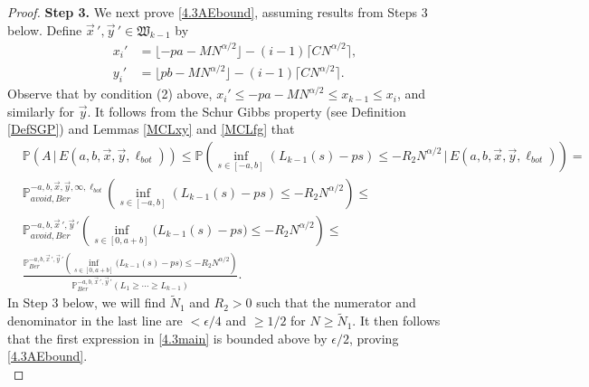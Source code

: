 \begin{proof}
		\noindent\textbf{Step 3.} We next prove \eqref{4.3AEbound}, assuming results from Steps 3 below. Define $\vec{x}\,',\vec{y}\,' \in \mathfrak{W}_{k-1}$ by
		\begin{align*}
		x_i' &= \lfloor - pa - MN^{\alpha/2}\rfloor - (i-1)\lceil CN^{\alpha/2}\rceil,\\
		y_i' &= \lfloor pb - MN^{\alpha/2}\rfloor - (i-1)\lceil CN^{\alpha/2}\rceil.
		\end{align*}  
		Observe that by condition (2) above, $x_i'\leq -pa - MN^{\alpha/2} \leq x_{k-1} \leq x_i$, and similarly for $\vec{y}$. It follows from the Schur Gibbs property (see Definition \ref{DefSGP}) and Lemmas \ref{MCLxy} and \ref{MCLfg} that
		\begin{equation}\label{4.3main}
		\begin{split}
		&\mathbb{P}(A\,|\,E(a,b,\vec{x},\vec{y},\ell_{bot})) \leq \mathbb{P}\left( \inf_{s\in[-a, b]} \left(L_{k-1}(s) - ps\right) \leq -R_2N^{\alpha/2}\, \big| \, E(a,b,\vec{x},\vec{y},\ell_{bot}) \right) = \\
		&\mathbb{P}^{-a,b, \vec{x}, \vec{y},\infty,\ell_{bot}}_{avoid, Ber} \left( \inf_{s\in[-a, b]} \left(L_{k-1}(s) - ps\right) \leq -R_2N^{\alpha/2} \right) \leq\\
		& \mathbb{P}^{-a, b, \vec{x}\,', \vec{y}\,'}_{avoid, Ber} \left( \inf_{s\in[0,a+b]} \big(L_{k-1}(s) - ps\big) \leq -R_2N^{\alpha/2} \right) \leq \\
		&\frac{\mathbb{P}^{-a, b, \vec{x}\,', \vec{y}\,'}_{Ber} \left( \inf_{s\in[0,a+b]} \big(L_{k-1}(s) - ps\big) \leq -R_2 N^{\alpha/2} \right)}{\mathbb{P}^{-a, b, \vec{x}\,', \vec{y}\,'}_{Ber}(L_1 \geq \cdots \geq L_{k-1})}.
		\end{split}
		\end{equation}
		In Step 3 below, we will find $\tilde{N}_1$ and $R_2 > 0$ such that the numerator and denominator in the last line are $<\epsilon/4$ and $\geq1/2$ for $N\geq\tilde{N}_1$. It then follows that the first expression in \eqref{4.3main} is bounded above by $\epsilon/2$, proving \eqref{4.3AEbound}.\\
		

\end{proof}
